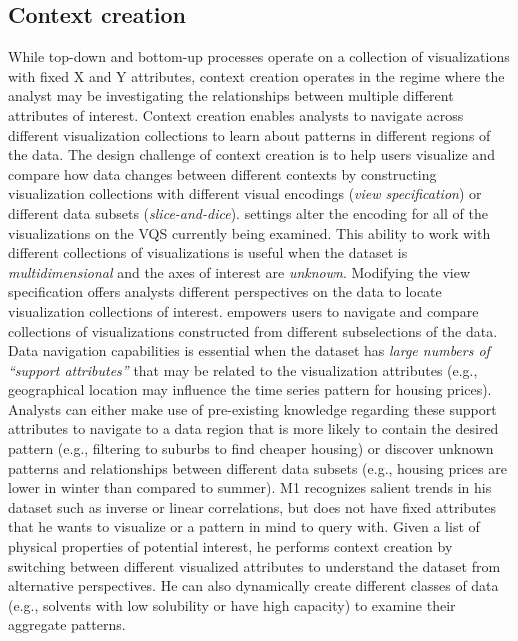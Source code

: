 {  \subsection{Context creation}
  While top-down and bottom-up processes operate on a collection of visualizations with fixed X and Y attributes, context creation operates in the regime where the analyst may be investigating the relationships between multiple different attributes of interest. Context creation enables analysts to navigate across different visualization collections to learn about patterns in different regions of the data. The design challenge of context creation is to help users visualize and compare how data changes between different contexts by constructing visualization collections with different visual encodings (\textit{view specification}) or different data subsets (\textit{slice-and-dice}).%
   settings alter the encoding for all of the visualizations on the VQS currently being examined. This ability to work with different collections of visualizations is useful when the dataset is \emph{multidimensional} and the axes of interest are \emph{unknown}. Modifying the view specification offers analysts different perspectives on the data to locate visualization collections of interest.
   empowers users to navigate and compare collections of visualizations constructed from different subselections of the data. Data navigation capabilities is essential when the dataset has \emph{large numbers of ``support attributes''} that may be related to the visualization attributes (e.g., geographical location may influence the time series pattern for housing prices). Analysts can either make use of pre-existing knowledge regarding these support attributes to navigate to a data region that is more likely to contain the desired pattern (e.g., filtering to suburbs to find cheaper housing) or discover unknown patterns and relationships between different data subsets (e.g., housing prices are lower in winter than compared to summer).%
   M1 recognizes salient trends in his dataset such as inverse or linear correlations, but does not have fixed attributes that he wants to visualize or a pattern in mind to query with. Given a list of physical properties of potential interest, he performs context creation by switching between different visualized attributes to understand the dataset from alternative perspectives. He can also dynamically create different classes of data (e.g., solvents with low solubility or have high capacity) to examine their aggregate patterns.
}
